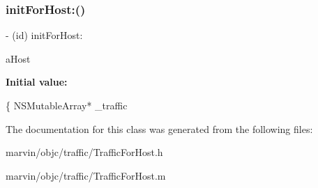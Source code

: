 \subsubsection{\texorpdfstring{init\+For\+Host\+:()}{initForHost:()}}
{\footnotesize\ttfamily -\/ (id) init\+For\+Host\+: \begin{DoxyParamCaption}\item[{(N\+S\+String$\ast$)}]{a\+Host }\end{DoxyParamCaption}}

{\bfseries Initial value\+:}
\begin{DoxyCode}
\{
    NSMutableArray* \_traffic
\end{DoxyCode}


The documentation for this class was generated from the following files\+:\begin{DoxyCompactItemize}
\item 
marvin/objc/traffic/Traffic\+For\+Host.\+h\item 
marvin/objc/traffic/Traffic\+For\+Host.\+m\end{DoxyCompactItemize}
